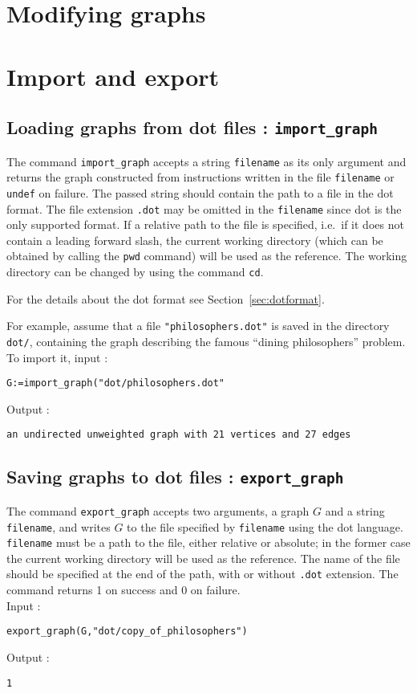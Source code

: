 \documentclass[a4paper,11pt]{article}
\begin{document}
\section{Modifying graphs}

\section{Import and export}

\subsection{Loading graphs from {\sf dot} files : {\tt import\_graph}}

The command {\tt import\_graph} accepts a string {\tt filename} as its only argument and returns the graph constructed from instructions written in the file {\tt filename} or {\tt undef} on failure. The passed string should contain the path to a file in the {\sf dot} format. The file extension {\tt .dot} may be omitted in the {\tt filename} since {\sf dot} is the only supported format. If a relative path to the file is specified, i.e.~if it does not contain a leading forward slash, the current working directory (which can be obtained by calling the {\tt pwd} command) will be used as the reference. The working directory can be changed by using the command {\tt cd}.

For the details about the {\sf dot} format see Section~\ref{sec:dotformat}.

For example, assume that a file {\tt "philosophers.dot"} is saved in the directory {\tt dot/}, containing the graph describing the famous ``dining philosophers'' problem. To import it, input :
\begin{center}
  \tt G:=import\_graph("dot/philosophers.dot"
\end{center}
Output :
\begin{center}
  \tt an undirected unweighted graph with 21 vertices and 27 edges
\end{center}

\subsection{Saving graphs to {\sf dot} files : {\tt export\_graph}}

The command {\tt export\_graph} accepts two arguments, a graph $ G $ and a string {\tt filename}, and writes $ G $ to the file specified by {\tt filename} using the {\sf dot} language. {\tt filename} must be a path to the file, either relative or absolute; in the former case the current working directory will be used as the reference. The name of the file should be specified at the end of the path, with or without {\tt .dot} extension. The command returns 1 on success and 0 on failure.\\
Input :
\begin{center}
  \tt export\_graph(G,"dot/copy\_of\_philosophers")
\end{center}
Output :
\begin{center}
  \tt 1
\end{center}
\end{document}
